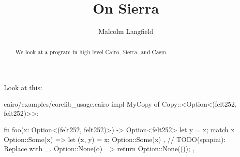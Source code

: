 \documentclass[10pt]{amsart}
\begin{document}
\title{On Sierra}
\author{Malcolm Langfield}
\begin{abstract}
  We look at a program in high-level Cairo, Sierra, and Casm.
\end{abstract}

\maketitle

Look at this:
\vspace{1em}
\begin{code}{cairo/examples/corelib\_usage.cairo}
impl MyCopy of Copy::<Option<(felt252, felt252)>>;

fn foo(x: Option<(felt252, felt252)>) -> Option<felt252> {
    let y = x;
    match x {
        Option::Some(x) => {
            let (x, y) = x;
            Option::Some(x)
        },
        // TODO(spapini): Replace with _.
        Option::None(o) => {
            return Option::None(());
        },
    }
}
\end{code}
\end{document}
